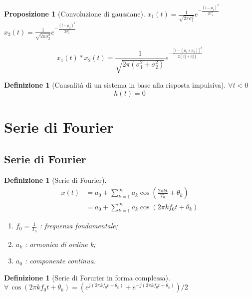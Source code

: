 \documentclass[a4paper,10pt]{article}
\theoremstyle{mystyle}
\newtheorem{definition}[theorem]{Definizione}
\newtheorem{proposition}[theorem]{Proposizione}
\begin{document}
\begin{multicols}{2}
\begin{proposition}[Convoluzione di gaussiane]
    \(x_1(t) = \frac{1}{\sqrt{2\pi \sigma_1^2}} e^{- \frac{(t- \mu_1)^2}{2 \sigma_1^2}}\) \\
    \(x_2(t) = \frac{1}{\sqrt{2\pi \sigma_2^2}} e^{- \frac{(t- \mu_2)^2}{2 \sigma_2^2}}\)

    \[
        x_1(t)*x_2(t) = \frac{1}{\sqrt{2\pi (\sigma_1^2 + \sigma_2^2)}} e^{- \frac{[t- (\mu_1 + \mu_2)]^2}{2 (\sigma_2^2 + \sigma_2^2)}}
    \]

\end{proposition}

\begin{definition}[Causalità di un sistema in base alla risposta impulsiva]
    \(
        \forall t < 0
    \)
    \[
        h(t)=0
    \]    
\end{definition}

\newpage

\section{Serie di Fourier}

\subsection{Serie di Fourier}
\begin{definition}[Serie di Fourier]
    \begin{align*}
        x(t)
        &=a_0+\sum_{k=1}^{\infty} a_k \cos \left ( \frac{2 \pi k t}{T_0} + \theta_k\right) \\
        &= a_0 + \sum_{k=1}^\infty a_k \cos(2 \pi k f_0 t + \theta_k)
    \end{align*}
    
    \begin{enumerate}[label=\roman*.]
        \item \(f_0=\frac{1}{T_0}\) : frequenza fondamentale;
        \item \(a_k\) : armonica di ordine k;
        \item \(a_0\) : componente continua.
    \end{enumerate}
\end{definition}

\begin{definition}[Serie di Forurier in forma complessa]
    \( \forall \, \cos(2 \pi k f_0 t + \theta_k) = (e^{j(2\pi k f_0 t + \theta_k)}+e^{-j(2\pi k f_0 t + \theta_k)})/2\)


\end{definition}
\end{multicols}
\end{document}
